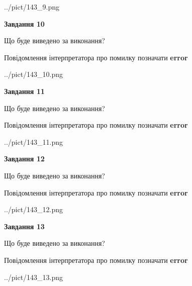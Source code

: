 \documentclass[11pt, ukrainian]{article}
\begin{document}
{\begin {large}
\begin{center}
	{../pict/143_9.png}
\end{center}
\newpage

{\begin {center}\textbf{Завдання 10}\end {center}}\par
Що буде виведено за виконання? \par
Повідомлення інтерпретатора про помилку позначати \textbf{error}

\begin{center}
	{../pict/143_10.png}
\end{center}
\newpage

{\begin {center}\textbf{Завдання 11}\end {center}}\par
Що буде виведено за виконання? \par
Повідомлення інтерпретатора про помилку позначати \textbf{error}

\begin{center}
	{../pict/143_11.png}
\end{center}
\newpage

{\begin {center}\textbf{Завдання 12}\end {center}}\par
Що буде виведено за виконання? \par
Повідомлення інтерпретатора про помилку позначати \textbf{error}

\begin{center}
	{../pict/143_12.png}
\end{center}
\newpage

{\begin {center}\textbf{Завдання 13}\end {center}}\par
Що буде виведено за виконання? \par
Повідомлення інтерпретатора про помилку позначати \textbf{error}

\begin{center}
	{../pict/143_13.png}
\end{center}
\newpage


\end{large}}
\end{document}
